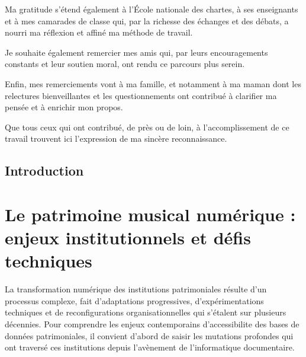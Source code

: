 \documentclass[12pt,twoside]{book}
\begin{document}
	Ma gratitude s'étend également à l'École nationale des chartes, à ses enseignants et à mes camarades de classe qui, par la richesse des échanges et des débats, a nourri ma réflexion et affiné ma méthode de travail.
	
	Je souhaite également remercier mes amis qui, par leurs encouragements constants et leur soutien moral, ont rendu ce parcours plus serein.
	
	Enfin, mes remerciements vont à ma famille, et notamment à ma maman dont les relectures bienveillantes et les questionnements ont contribué à clarifier ma pensée et à enrichir mon propos.
	
	Que tous ceux qui ont contribué, de près ou de loin, à l'accomplissement de ce travail trouvent ici l'expression de ma sincère reconnaissance.
	
	\newpage{\pagestyle{empty}\cleardoublepage}
	
	
	
	
	\chapter{Introduction}	
	
	
	
	\newpage{\pagestyle{empty}\cleardoublepage}
	
	\mainmatter
	
	
	
	\part[La patrimoine musical]{Le patrimoine musical numérique : enjeux institutionnels et défis techniques}
	
	La transformation numérique des institutions patrimoniales résulte d'un processus complexe, fait d'adaptations progressives, d'expérimentations techniques et de reconfigurations organisationnelles qui s'étalent sur plusieurs décennies. Pour comprendre les enjeux contemporains d'\gls{accessibilite} des bases de données patrimoniales, il convient d'abord de saisir les mutations profondes qui ont traversé ces institutions depuis l'avènement de l'informatique documentaire.
	
\end{document}
